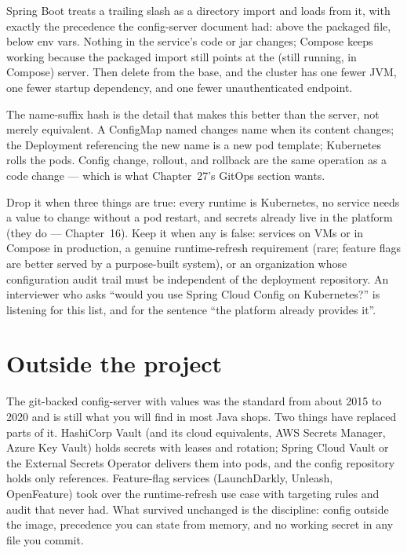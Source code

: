 Spring Boot treats a trailing slash as a directory import and loads
 from it, with exactly the precedence the
config-server document had: above the packaged file, below env vars.
Nothing in the service's code or jar changes; Compose keeps working
because the packaged  import still points
at the (still running, in Compose) server. Then delete
 from the base, and the cluster has one fewer
JVM, one fewer startup dependency, and one fewer unauthenticated
endpoint.

The name-suffix hash is the detail that makes this better than the
server, not merely equivalent. A ConfigMap named
 changes name when its content
changes; the Deployment referencing the new name is a new pod
template; Kubernetes rolls the pods. Config change, rollout, and
rollback are the same operation as a code change --- which is what
Chapter~27's GitOps section wants.

\begin{decision}
Drop it when three things are true: every runtime is Kubernetes, no
service needs a value to change without a pod restart, and secrets
already live in the platform (they do --- Chapter~16). Keep it when any
is false: services on VMs or in Compose in production, a genuine
runtime-refresh requirement (rare; feature flags are better served by a
purpose-built system), or an organization whose configuration audit
trail must be independent of the deployment repository. An interviewer
who asks ``would you use Spring Cloud Config on Kubernetes?'' is
listening for this list, and for the sentence ``the platform already
provides it''.
\end{decision}

\section{Outside the project}

The git-backed config-server with  values was the
standard from about 2015 to 2020 and is still what you will find in
most Java shops. Two things have replaced parts of it. HashiCorp Vault
(and its cloud equivalents, AWS Secrets Manager, Azure Key Vault) holds
secrets with leases and rotation; Spring Cloud Vault or the External
Secrets Operator delivers them into pods, and the config repository
holds only references. Feature-flag services (LaunchDarkly, Unleash,
OpenFeature) took over the runtime-refresh use case with targeting
rules and audit that  never had. What survived
unchanged is the discipline: config outside the image, precedence you
can state from memory, and no working secret in any file you commit.


